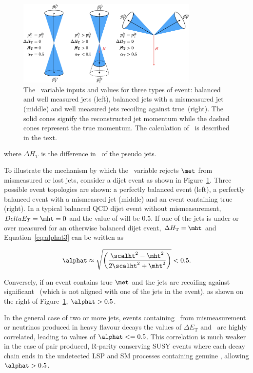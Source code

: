 \begin{figure}
\centering
    \includegraphics[width=0.8\textwidth]{./Figures/alphat/alphat_cartoon}
  \caption{\label{fig:alphat_cartoon} The \alphat~variable inputs and values for three types of event: balanced and well measured jets (left), balanced jets with
  a mismeasured jet (middle) and well measured jets recoiling against true~\met (right). The solid cones signify the reconstructed jet momentum while the 
  dashed cones represent the true momentum. The calculation of \alphat~is described in the text.} 
\end{figure}
where $\Delta H_{\textrm{T}}$ is the difference in \pt~of the pseudo jets.

To illustrate the mechanism by which the \alphat~variable rejects $\met$ from mismeasured or lost jets,
consider a dijet event as shown in Figure~\ref{fig:alphat_cartoon}. Three possible event topologies are shown: 
a perfectly balanced event (left), a perfectly balanced event with a mismeasred jet (middle) and an event containing true \met (right).
In a typical balanced QCD dijet event without mismeasurement, $Delta E_T = \mht = 0$ and the 
value of \alphat will be 0.5. If one of the jets is under or over measured for an otherwise balanced dijet
event, $\Delta H_{\textrm{T}} = \mht$ and Equation~\ref{eq:alphat3} can be written as 

\begin{equation}
  \label{eq:alphat4}
   \alphat \approx \sqrt{\left(\frac{\scalht^2 - \mht^2}{2\scalht^2 + \mht^2}\right)} < 0.5.
\end{equation}

Conversely, if an event contains true $\met$ and the jets are recoiling against significant~\met 
(which is not aligned with one of the jets in the event), as shown on the right of 
Figure~\ref{fig:alphat_cartoon}, $\alphat > 0.5$. 

In the general case of two or more jets, events containing \met~from mismeasurement or 
neutrinos produced in heavy flavour decays the values of $\Delta E_{\textrm{T}}$ and \mht~are highly correlated, leading
to values of $\alphat <= 0.5$. This correlation is much weaker in the case of pair produced, 
R-parity conserving SUSY events where each decay chain ends in the 
undetected LSP and SM processes containing genuine \met, allowing $\alphat > 0.5$.

